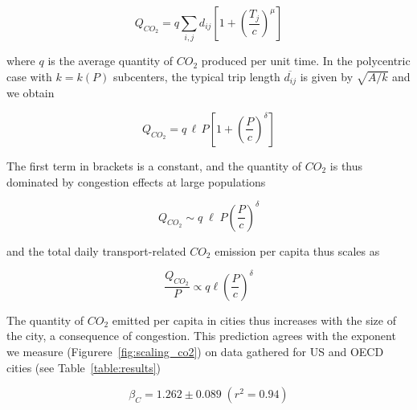 \begin{equation}
    Q_{CO_2}  = q \sum_{i,j} d_{ij} \left[ 1+ \left( \frac{T_j}{c} \right)^\mu \right]
\end{equation}

where $q$ is the average quantity of $CO_2$ produced per unit time. In the
polycentric case with $k=k(P)$ subcenters, the typical trip length
$\overline{d_{ij}}$ is given by $\sqrt{A/k}$ and we obtain

\begin{equation}
    Q_{CO_2} = q\, \ell\, P \left[ 1 + \left(\frac{P}{c}\right)^{\delta} \right]
\end{equation}

The first term in brackets is a constant, and the quantity of $CO_2$ is thus
dominated by congestion effects at large populations

\begin{equation}
    Q_{CO_2} \sim q\; \ell\; P \left(\frac{P}{c}\right)^{\delta}
\end{equation}



and the total daily transport-related $CO_2$ emission per capita thus scales as 

\begin{equation}
    \frac{Q_{CO_2}}{P} \propto  q\ell \left(\frac{P}{c}\right)^{\delta}
\end{equation}

The quantity of $CO_2$ emitted per capita in cities thus increases with the size
of the city, a consequence of congestion. This prediction agrees with the
exponent we measure (Figurere~\ref{fig:scaling_co2}) on data gathered for US and OECD cities (see
Table~\ref{table:results})

\begin{equation}
    \boxed{\beta_C = 1.262 \pm 0.089\;(r^2=0.94)}
\end{equation}

